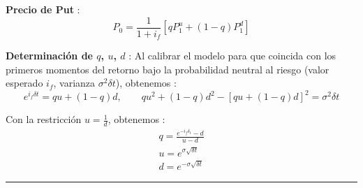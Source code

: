 \begin{f}
\textbf{Precio de Put} :
\[
P_{0} = \frac{1}{1+i_f} \left[ q P_{1}^{u} + (1 - q) P_{1}^{d} \right]
\]

\textbf{Determinación de \(q\), \(u\), \(d\)} :  
Al calibrar el modelo para que coincida con los primeros momentos del retorno bajo la probabilidad neutral al riesgo (valor esperado \(i_f\), varianza \(\sigma^2 \delta t\)), obtenemos :
\[
e^{i_{f} \delta t} = q u + (1-q) d, \qquad q u^2 + (1-q) d^2 - [q u + (1-q) d]^2 = \sigma^2 \delta t
\]

Con la restricción \(u = \frac{1}{d}\), obtenemos :
\[
\begin{array}{l}
	q = \frac{e^{-i_f \delta_t} - d}{u - d} \\
	u = e^{\sigma \sqrt{\delta t}} \\
	d = e^{-\sigma \sqrt{\delta t}}
\end{array}
\]

\end{f}
\hrule

